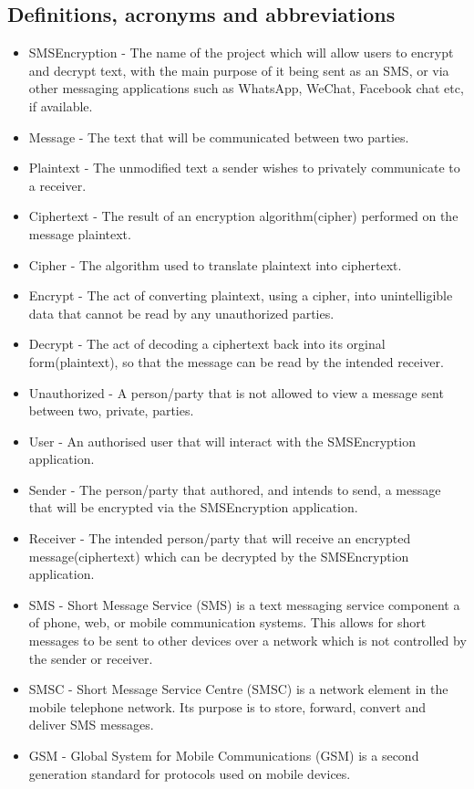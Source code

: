 \subsection{Definitions, acronyms and abbreviations}
\begin{itemize}
\item SMSEncryption - The name of the project which will allow users to encrypt and decrypt text, with the main purpose of it being sent as an SMS, or via other messaging applications such as WhatsApp, WeChat, Facebook chat etc, if available.
\item Message - The text that will be communicated between two parties.
\item Plaintext -  The unmodified text a sender wishes to privately communicate to a receiver. 
\item Ciphertext - The result of an encryption algorithm(cipher) performed on the message plaintext.
\item Cipher - The algorithm used to translate plaintext into ciphertext.
\item Encrypt -  The act of converting plaintext, using a cipher, into unintelligible data that cannot be read by any unauthorized parties.
\item Decrypt - The act of decoding a ciphertext back into its orginal form(plaintext), so that the message can be read by the intended receiver.
\item Unauthorized - A person/party that is not allowed to view a message sent between two, private, parties.
\item User - An authorised user that will interact with the SMSEncryption application.
\item Sender - The person/party that authored, and intends to send, a message that will be encrypted via the SMSEncryption application.
\item Receiver - The intended person/party that will receive an encrypted message(ciphertext) which can be decrypted by the SMSEncryption application.
\item SMS - Short Message Service (SMS) is a text messaging service component a of phone, web, or mobile communication systems. This allows for short messages to be sent to other devices over a network which is not controlled by the sender or receiver.
\item SMSC - Short Message Service Centre (SMSC) is a network element in the mobile telephone network. Its purpose is to store, forward, convert and deliver SMS messages.
\item GSM - Global System for Mobile Communications (GSM) is a second generation standard for protocols used on mobile devices.

\end{itemize}
